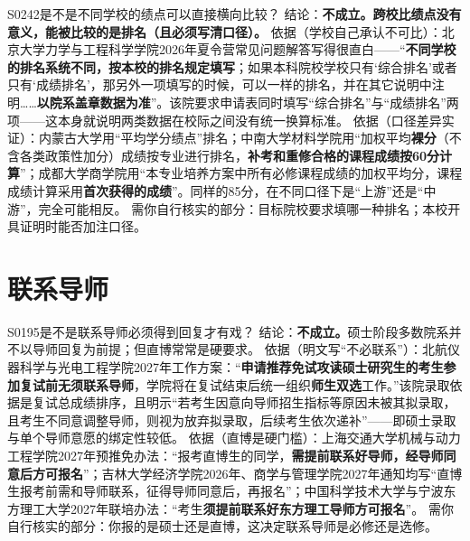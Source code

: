\begin{qa}{S0242}{是不是不同学校的绩点可以直接横向比较？}
结论：\textbf{不成立。跨校比绩点没有意义，能被比较的是排名（且必须写清口径）。}
依据（学校自己承认不可比）：北京大学力学与工程科学学院2026年夏令营常见问题解答写得很直白——“\textbf{不同学校的排名系统不同，按本校的排名规定填写}；如果本科院校学校只有‘综合排名’或者只有‘成绩排名’，那另外一项填写的时候，可以一样的排名，并在其它说明中注明……\textbf{以院系盖章数据为准}”。该院要求申请表同时填写“综合排名”与“成绩排名”两项——这本身就说明两类数据在校际之间没有统一换算标准。
依据（口径差异实证）：内蒙古大学用“平均学分绩点”排名；中南大学材料学院用“加权平均\textbf{裸分}（不含各类政策性加分）成绩按专业进行排名，\textbf{补考和重修合格的课程成绩按60分计算}”；成都大学商学院用“本专业培养方案中所有必修课程成绩的加权平均分，课程成绩计算采用\textbf{首次获得的成绩}”。同样的85分，在不同口径下是“上游”还是“中游”，完全可能相反。
需你自行核实的部分：目标院校要求填哪一种排名；本校开具证明时能否加注口径。
\end{qa}

\section{联系导师}
\begin{qa}{S0195}{是不是联系导师必须得到回复才有戏？}
结论：\textbf{不成立。}硕士阶段多数院系并不以导师回复为前提；但直博常常是硬要求。
依据（明文写“不必联系”）：北航仪器科学与光电工程学院2027年工作方案：“\textbf{申请推荐免试攻读硕士研究生的考生参加复试前无须联系导师}，学院将在复试结束后统一组织\textbf{师生双选}工作。”该院录取依据是复试总成绩排序，且明示“若考生因意向导师招生指标等原因未被其拟录取，且考生不同意调整导师，则视为放弃拟录取，后续考生依次递补”——即硕士录取与单个导师意愿的绑定性较低。
依据（直博是硬门槛）：上海交通大学机械与动力工程学院2027年预推免办法：“报考直博生的同学，\textbf{需提前联系好导师，经导师同意后方可报名}”；吉林大学经济学院2026年、商学与管理学院2027年通知均写“直博生报考前需和导师联系，征得导师同意后，再报名”；中国科学技术大学与宁波东方理工大学2027年联培办法：“考生\textbf{须提前联系好东方理工导师方可报名}”。
需你自行核实的部分：你报的是硕士还是直博，这决定联系导师是必修还是选修。
\end{qa}

